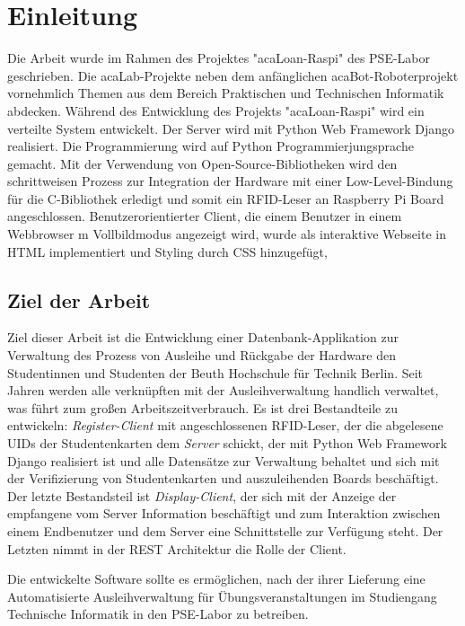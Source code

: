 \chapter{Einleitung}
\label{sec:intro}
Die Arbeit wurde im Rahmen des Projektes "acaLoan-Raspi"\cite{website:17} des PSE-Labor geschrieben. Die acaLab-Projekte neben dem anfänglichen acaBot-Roboterprojekt vornehmlich Themen aus dem Bereich Praktischen und Technischen Informatik abdecken\cite{website:1}. Während des Entwicklung des Projekts  "acaLoan-Raspi" wird ein verteilte System entwickelt. Der Server wird mit Python Web Framework Django realisiert. Die Programmierung wird auf Python Programmierjungsprache gemacht. Mit der Verwendung von Open-Source-Bibliotheken wird den schrittweisen Prozess zur Integration der Hardware mit einer Low-Level-Bindung für die C-Bibliothek erledigt und somit ein RFID-Leser an Raspberry Pi Board angeschlossen. Benutzerorientierter Client, die einem Benutzer in einem Webbrowser m Vollbildmodus angezeigt wird, wurde als interaktive Webseite in HTML implementiert und Styling durch CSS hinzugefügt, 


\section{Ziel der Arbeit}
\label{sec:intro:goal}
Ziel dieser Arbeit ist die Entwicklung einer Datenbank-Applikation zur Verwaltung des Prozess von Ausleihe und Rückgabe der Hardware den Studentinnen und Studenten der Beuth Hochschule für Technik Berlin. Seit Jahren werden alle verknüpften mit der Ausleihverwaltung handlich verwaltet, was führt zum großen Arbeitszeitverbrauch. Es ist drei Bestandteile zu entwickeln: \textit{Register-Client} mit angeschlossenen RFID-Leser, der die abgelesene UIDs der Studentenkarten dem \textit{Server} schickt, der mit Python Web Framework Django realisiert ist und alle Datensätze zur Verwaltung behaltet und sich mit der Verifizierung von Studentenkarten und auszuleihenden Boards beschäftigt. Der letzte Bestandsteil ist \textit{Display-Client}, der sich mit der Anzeige der empfangene vom Server Information beschäftigt und zum Interaktion zwischen einem Endbenutzer und dem Server eine Schnittstelle zur Verfügung steht. Der Letzten nimmt in der REST Architektur die Rolle der Client. 

Die entwickelte Software sollte es ermöglichen, nach der ihrer Lieferung eine Automatisierte Ausleihverwaltung für Übungsveranstaltungen im Studiengang Technische Informatik in den PSE-Labor zu betreiben. 

